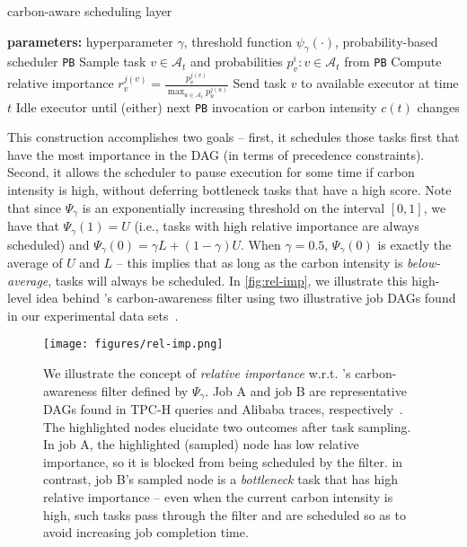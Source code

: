 \begin{algorithm}[h]
	\caption{\DANISH carbon-aware scheduling layer}
	\label{alg:danish}
	\begin{algorithmic}[1]
		\STATE \textbf{parameters:} hyperparameter $\gamma$, threshold function $\psi_\gamma(\cdot)$, probability-based scheduler \texttt{PB}
        \STATE Sample task $v \in \mathcal{A}_t$ and probabilities $p^i_v : v \in \mathcal{A}_t$ from \texttt{PB}
        \STATE Compute relative importance $r_v^{j(v)} = \frac{p_v^{j(v)}}{\max_{u \in \mathcal{A}_t} p_u^{j(u)}}$
        \STATE Send task $v$ to available executor at time $t$
        \ELSE
        \STATE Idle executor until (either) next \texttt{PB} invocation or carbon intensity $c(t)$ changes
        \ENDIF
        \ENDIF
        \ENDWHILE
	\end{algorithmic}
\end{algorithm}	

This construction accomplishes two goals -- first, it schedules those tasks first that have the most importance in the DAG (in terms of precedence constraints).  Second, it allows the scheduler to pause execution for some time if carbon intensity is high, without deferring bottleneck tasks that have a high score.  Note that since $\Psi_\gamma$ is an exponentially increasing threshold on the interval $[0,1]$, we have that $\Psi_\gamma(1) = U$ (i.e., tasks with high relative importance are always scheduled) and $\Psi_\gamma(0) = \gamma L + (1-\gamma) U$.  When $\gamma = 0.5$, $\Psi_\gamma(0)$ is exactly the average of $U$ and $L$ -- this implies that as long as the carbon intensity is \textit{below-average}, tasks will always be scheduled.  
In \autoref{fig:rel-imp}, we illustrate this high-level idea behind \DANISH's carbon-awareness filter using two illustrative job DAGs found in our experimental data sets~\cite{TPCH:18, Alibaba:18}.

\begin{figure}[h]
    \centering
    \texttt{[image: figures/rel-imp.png]}
    \caption{We illustrate the concept of \textit{relative importance} w.r.t. \DANISH's carbon-awareness filter defined by $\Psi_\gamma$.  Job A and job B are representative DAGs found in TPC-H queries and Alibaba traces, respectively~\cite{TPCH:18, Alibaba:18}.  The highlighted nodes elucidate two outcomes after task sampling.  In job A, the highlighted (sampled) node has low relative importance, so it is blocked from being scheduled by the filter.  in contrast, job B's sampled node is a \textit{bottleneck} task that has high relative importance -- even when the current carbon intensity is high, such tasks pass through the filter and are scheduled so as to avoid increasing job completion time.}
    \label{fig:rel-imp}
\end{figure}


